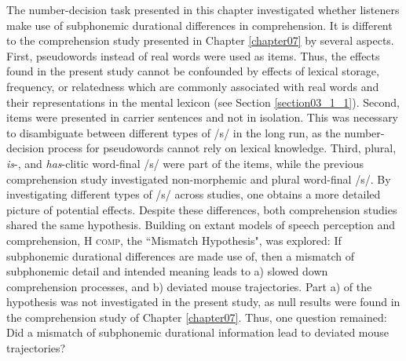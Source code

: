 The number-decision task presented in this chapter investigated whether listeners make use of subphonemic durational differences in comprehension. It is different to the comprehension study presented in Chapter \ref{chapter07} by several aspects. First, pseudowords instead of real words were used as items. Thus, the effects found in the present study cannot be confounded by effects of lexical storage, frequency, or relatedness which are commonly associated with real words and their representations in the mental lexicon (see Section \ref{section03_1_1}). Second, items were presented in carrier sentences and not in isolation. This was necessary to disambiguate between different types of /s/ in the long run, as the number-decision process for pseudowords cannot rely on lexical knowledge. Third, plural, \textit{is}-, and \textit{has}-clitic word-final /s/ were part of the items, while the previous comprehension study investigated non-morphemic and plural word-final /s/. By investigating different types of /s/ across studies, one obtains a more detailed picture of potential effects. Despite these differences, both comprehension studies shared the same hypothesis. Building on extant models of speech perception and comprehension, \textsc{H comp}, the ``Mismatch Hypothesis", was explored: If subphonemic durational differences are made use of, then a mismatch of subphonemic detail and intended meaning leads to a) slowed down comprehension processes, and b) deviated mouse trajectories. Part a) of the hypothesis was not investigated in the present study, as null results were found in the comprehension study of Chapter \ref{chapter07}. Thus, one question remained: Did a mismatch of subphonemic durational information lead to deviated mouse trajectories?

